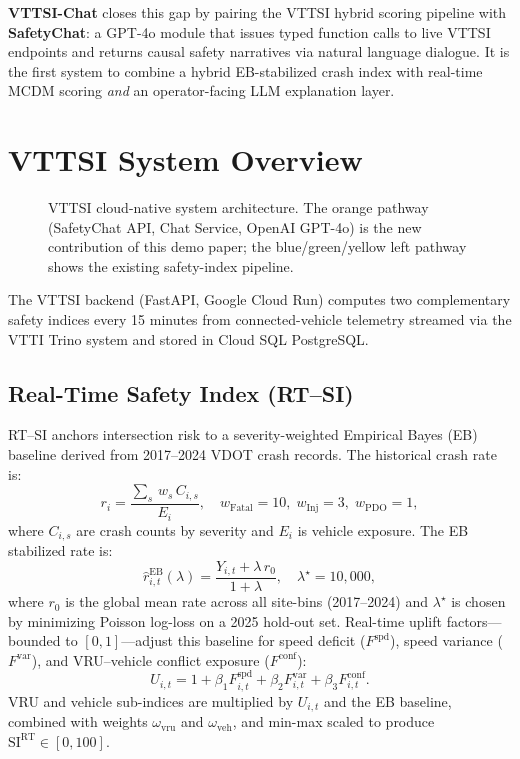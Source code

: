 \documentclass[conference]{IEEEtran}
\begin{document}
\textbf{VTTSI-Chat} closes this gap by pairing the VTTSI hybrid scoring pipeline with
\textbf{SafetyChat}: a GPT-4o module that issues typed function calls to live VTTSI
endpoints and returns causal safety narratives via natural language dialogue.
It is the first system to combine a hybrid EB-stabilized crash index with real-time
MCDM scoring \emph{and} an operator-facing LLM explanation layer.

\section{VTTSI System Overview}
\label{sec:system}

\begin{figure}[t]
\centering
\resizebox{\textwidth}{!}{%
%
}
\caption{VTTSI cloud-native system architecture. The orange pathway (SafetyChat API,
         Chat Service, OpenAI GPT-4o) is the new contribution of this demo paper;
         the blue/green/yellow left pathway shows the existing safety-index pipeline.}
\label{fig:architecture}
\end{figure}

The VTTSI backend (FastAPI, Google Cloud Run) computes two complementary safety indices
every 15 minutes from connected-vehicle telemetry streamed via the VTTI Trino system
and stored in Cloud SQL PostgreSQL.

\subsection{Real-Time Safety Index (RT--SI)}

RT--SI anchors intersection risk to a severity-weighted Empirical Bayes (EB) baseline
derived from 2017--2024 VDOT crash records.
The historical crash rate is:
\begin{equation}
r_i = \frac{\sum_{s}\, w_s\, C_{i,s}}{E_i},
\quad w_{\text{Fatal}}=10,\; w_{\text{Inj}}=3,\; w_{\text{PDO}}=1,
\end{equation}
where $C_{i,s}$ are crash counts by severity and $E_i$ is vehicle exposure.
The EB stabilized rate is:
\begin{equation}
\hat{r}^{\text{EB}}_{i,t}(\lambda) =
\frac{Y_{i,t} + \lambda\, r_0}{1 + \lambda},
\quad \lambda^\star = 10{,}000,
\end{equation}
where $r_0$ is the global mean rate across all site-bins (2017--2024) and
$\lambda^\star$ is chosen by minimizing Poisson log-loss on a 2025 hold-out set.
Real-time uplift factors---bounded to $[0,1]$---adjust this baseline for speed deficit
($F^{\text{spd}}$), speed variance ($F^{\text{var}}$), and VRU--vehicle conflict
exposure ($F^{\text{conf}}$):
\begin{equation}
U_{i,t} = 1 + \beta_1 F^{\text{spd}}_{i,t}
              + \beta_2 F^{\text{var}}_{i,t}
              + \beta_3 F^{\text{conf}}_{i,t}.
\end{equation}
VRU and vehicle sub-indices are multiplied by $U_{i,t}$ and the EB baseline,
combined with weights $\omega_{\text{vru}}$ and $\omega_{\text{veh}}$,
and min-max scaled to produce $\mathrm{SI}^{\text{RT}}\in[0,100]$.
\end{document}
